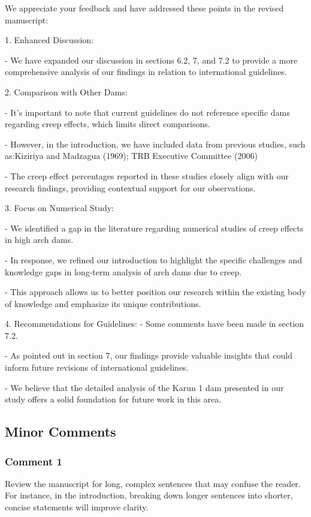 \documentclass{ar2rc}
\begin{document}
{	\AR We appreciate your feedback and have addressed these points in the revised manuscript:
	
	1. Enhanced Discussion:

	- We have expanded our discussion in sections 6.2, 7, and 7.2 to provide a more comprehensive analysis of our findings in relation to international guidelines.
	
	2. Comparison with Other Dams:

	- It's important to note that current guidelines do not reference specific dams regarding creep effects, which limits direct comparisons.

	- However, in the introduction, we have included data from previous studies, such as:Kiziriya and Madzagua (1969); TRB Executive Committee (2006)

	- The creep effect percentages reported in these studies closely align with our research findings, providing contextual support for our observations.
	
	3. Focus on Numerical Study:
	
	- We identified a gap in the literature regarding numerical studies of creep effects in high arch dams.
	
	- In response, we refined our introduction to highlight the specific challenges and knowledge gaps in long-term analysis of arch dams due to creep.
	
	- This approach allows us to better position our research within the existing body of knowledge and emphasize its unique contributions.
	
	4. Recommendations for Guidelines:
	- Some comments have been made in section 7.2.
	
	- As pointed out in section 7, our findings provide valuable insights that could inform future revisions of international guidelines.
	
	- We believe that the detailed analysis of the Karun 1 dam presented in our study offers a solid foundation for future work in this area.
	
	
	\subsection{Minor Comments}
	\subsubsection{Comment 1}
	
	\RC Review the manuscript for long, complex sentences that may confuse the reader. For instance, in the introduction, breaking down longer sentences into shorter, concise statements will improve clarity.
	
}
\end{document}
